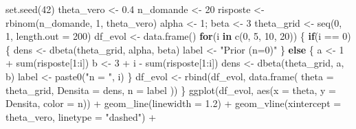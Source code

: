 \documentclass[
  italian,
  letterpaper,
  a4paper,
  11pt,
  open=any]{scrbook}
\newenvironment{Shaded}{\begin{snugshade}}{\end{snugshade}}
\newcommand{\AttributeTok}[1]{\textcolor[rgb]{0.40,0.45,0.13}{#1}}
\newcommand{\ControlFlowTok}[1]{\textcolor[rgb]{0.00,0.23,0.31}{\textbf{#1}}}
\newcommand{\DecValTok}[1]{\textcolor[rgb]{0.68,0.00,0.00}{#1}}
\newcommand{\FloatTok}[1]{\textcolor[rgb]{0.68,0.00,0.00}{#1}}
\newcommand{\FunctionTok}[1]{\textcolor[rgb]{0.28,0.35,0.67}{#1}}
\newcommand{\NormalTok}[1]{\textcolor[rgb]{0.00,0.23,0.31}{#1}}
\newcommand{\OtherTok}[1]{\textcolor[rgb]{0.00,0.23,0.31}{#1}}
\newcommand{\SpecialCharTok}[1]{\textcolor[rgb]{0.37,0.37,0.37}{#1}}
\newcommand{\StringTok}[1]{\textcolor[rgb]{0.13,0.47,0.30}{#1}}
\theoremstyle{plain}
\theoremstyle{definition}
\theoremstyle{definition}
\theoremstyle{remark}
\begin{document}
\begin{Shaded}
\begin{Highlighting}[]
\FunctionTok{set.seed}\NormalTok{(}\DecValTok{42}\NormalTok{)}
\NormalTok{theta\_vero }\OtherTok{\textless{}{-}} \FloatTok{0.4}
\NormalTok{n\_domande }\OtherTok{\textless{}{-}} \DecValTok{20}
\NormalTok{risposte }\OtherTok{\textless{}{-}} \FunctionTok{rbinom}\NormalTok{(n\_domande, }\DecValTok{1}\NormalTok{, theta\_vero)}
\NormalTok{alpha }\OtherTok{\textless{}{-}} \DecValTok{1}\NormalTok{; beta }\OtherTok{\textless{}{-}} \DecValTok{3}
\NormalTok{theta\_grid }\OtherTok{\textless{}{-}} \FunctionTok{seq}\NormalTok{(}\DecValTok{0}\NormalTok{, }\DecValTok{1}\NormalTok{, }\AttributeTok{length.out =} \DecValTok{200}\NormalTok{)}
\NormalTok{df\_evol }\OtherTok{\textless{}{-}} \FunctionTok{data.frame}\NormalTok{()}
\ControlFlowTok{for}\NormalTok{(i }\ControlFlowTok{in} \FunctionTok{c}\NormalTok{(}\DecValTok{0}\NormalTok{, }\DecValTok{5}\NormalTok{, }\DecValTok{10}\NormalTok{, }\DecValTok{20}\NormalTok{)) \{}
  \ControlFlowTok{if}\NormalTok{(i }\SpecialCharTok{==} \DecValTok{0}\NormalTok{) \{}
\NormalTok{    dens }\OtherTok{\textless{}{-}} \FunctionTok{dbeta}\NormalTok{(theta\_grid, alpha, beta)}
\NormalTok{    label }\OtherTok{\textless{}{-}} \StringTok{"Prior (n=0)"}
\NormalTok{  \} }\ControlFlowTok{else}\NormalTok{ \{}
\NormalTok{    a }\OtherTok{\textless{}{-}} \DecValTok{1} \SpecialCharTok{+} \FunctionTok{sum}\NormalTok{(risposte[}\DecValTok{1}\SpecialCharTok{:}\NormalTok{i])}
\NormalTok{    b }\OtherTok{\textless{}{-}} \DecValTok{3} \SpecialCharTok{+}\NormalTok{ i }\SpecialCharTok{{-}} \FunctionTok{sum}\NormalTok{(risposte[}\DecValTok{1}\SpecialCharTok{:}\NormalTok{i])}
\NormalTok{    dens }\OtherTok{\textless{}{-}} \FunctionTok{dbeta}\NormalTok{(theta\_grid, a, b)}
\NormalTok{    label }\OtherTok{\textless{}{-}} \FunctionTok{paste0}\NormalTok{(}\StringTok{"n = "}\NormalTok{, i)}
\NormalTok{  \}}
\NormalTok{  df\_evol }\OtherTok{\textless{}{-}} \FunctionTok{rbind}\NormalTok{(df\_evol, }\FunctionTok{data.frame}\NormalTok{(}
    \AttributeTok{theta =}\NormalTok{ theta\_grid, }\AttributeTok{Densita =}\NormalTok{ dens, }\AttributeTok{n =}\NormalTok{ label}
\NormalTok{  ))}
\NormalTok{\}}
\FunctionTok{ggplot}\NormalTok{(df\_evol, }\FunctionTok{aes}\NormalTok{(}\AttributeTok{x =}\NormalTok{ theta, }\AttributeTok{y =}\NormalTok{ Densita, }\AttributeTok{color =}\NormalTok{ n)) }\SpecialCharTok{+}
  \FunctionTok{geom\_line}\NormalTok{(}\AttributeTok{linewidth =} \FloatTok{1.2}\NormalTok{) }\SpecialCharTok{+}
  \FunctionTok{geom\_vline}\NormalTok{(}\AttributeTok{xintercept =}\NormalTok{ theta\_vero, }\AttributeTok{linetype =} \StringTok{"dashed"}\NormalTok{) }\SpecialCharTok{+}

\end{Highlighting}
\end{Shaded}
\end{document}
